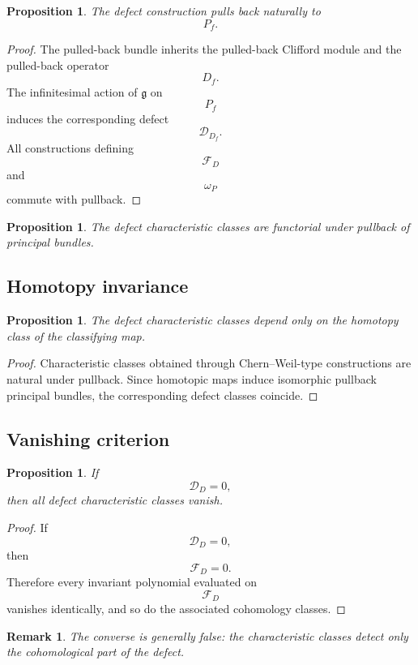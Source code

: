\documentclass[11pt]{amsart}
\newtheorem{proposition}[definition]{Proposition}
\newtheorem{remark}[definition]{Remark}
\begin{document}
\begin{proposition}
The defect construction pulls back naturally to
\[
P_f.
\]
\end{proposition}

\begin{proof}
The pulled-back bundle inherits the pulled-back Clifford module and the
pulled-back operator
\[
D_f.
\]
The infinitesimal action of \(\mathfrak g\) on
\[
P_f
\]
induces the corresponding defect
\[
\mathcal D_{D_f}.
\]
All constructions defining
\[
\mathcal F_D
\]
and
\[
\omega_P
\]
commute with pullback.
\end{proof}

\begin{proposition}
The defect characteristic classes are functorial under pullback of principal
bundles.
\end{proposition}

\subsection{Homotopy invariance}

\begin{proposition}
The defect characteristic classes depend only on the homotopy class of the
classifying map.
\end{proposition}

\begin{proof}
Characteristic classes obtained through Chern--Weil-type constructions are
natural under pullback. Since homotopic maps induce isomorphic pullback
principal bundles, the corresponding defect classes coincide.
\end{proof}

\subsection{Vanishing criterion}

\begin{proposition}
If
\[
\mathcal D_D=0,
\]
then all defect characteristic classes vanish.
\end{proposition}

\begin{proof}
If
\[
\mathcal D_D=0,
\]
then
\[
\mathcal F_D=0.
\]
Therefore every invariant polynomial evaluated on
\[
\mathcal F_D
\]
vanishes identically, and so do the associated cohomology classes.
\end{proof}

\begin{remark}
The converse is generally false: the characteristic classes detect only the
cohomological part of the defect.
\end{remark}
\end{document}
